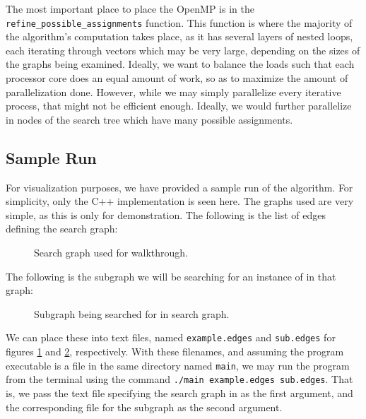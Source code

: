 \documentclass{article}
\begin{document}
  The most important place to place the OpenMP is in the \texttt{refine\_possible\_assignments} function. This function is where the majority of the algorithm's computation takes place, as it has several layers of nested loops, each iterating through vectors which may be very large, depending on the sizes of the graphs being examined. Ideally, we want to balance the loads such that each processor core does an equal amount of work, so as to maximize the amount of parallelization done. However, while we may simply parallelize every iterative process, that might not be efficient enough. Ideally, we would further parallelize in nodes of the search tree which have many possible assignments.

  \subsection{Sample Run}

  For visualization purposes, we have provided a sample run of the algorithm. For simplicity, only the C++ implementation is seen here. The graphs used are very simple, as this is only for demonstration. The following is the list of edges defining the search graph:

  \setcounter{figure}{0}
  \begin{figure}[H]
    \centering
    
    \caption{Search graph used for walkthrough.}
    \label{ls:toysearch}
  \end{figure}

  The following is the subgraph we will be searching for an instance of in that graph:

  \begin{figure}[H]
    \centering
    
    \caption{Subgraph being searched for in search graph.}
    \label{ls:toysub}
  \end{figure}

  We can place these into text files, named \texttt{example.edges} and \texttt{sub.edges} for figures \ref{ls:toysearch} and \ref{ls:toysub}, respectively. With these filenames, and assuming the program executable is a file in the same directory named \texttt{main}, we may run the program from the terminal using the command \texttt{./main example.edges sub.edges}. That is, we pass the text file specifying the search graph in as the first argument, and the corresponding file for the subgraph as the second argument.
\end{document}
